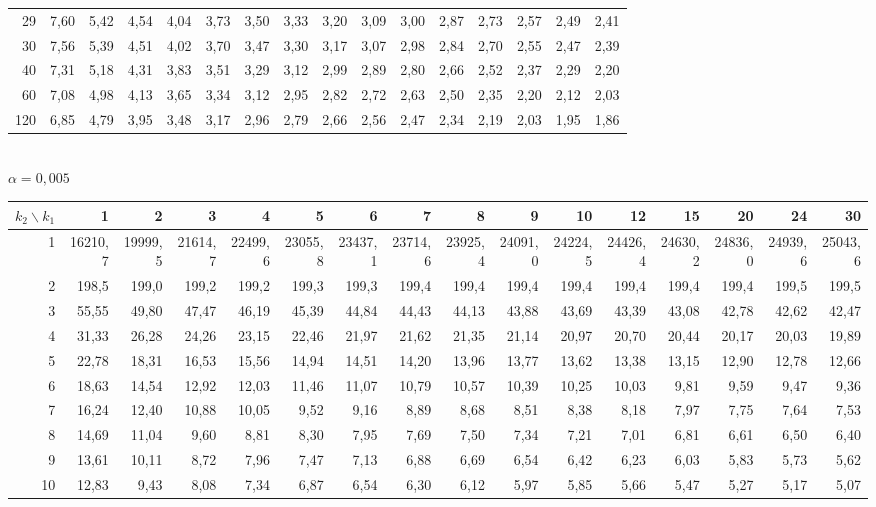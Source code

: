 \documentclass[a4paper,10pt]{extarticle}
\begin{document}
\begin{center}
\begin{tabular}{r|rrrrrrrrrrrrrrr}
29 & 7,60 & 5,42 & 4,54 & 4,04 & 3,73 & 3,50 & 3,33 & 3,20 & 3,09 & 3,00 & 2,87 & 2,73 & 2,57 & 2,49 & 2,41\\
30 & 7,56 & 5,39 & 4,51 & 4,02 & 3,70 & 3,47 & 3,30 & 3,17 & 3,07 & 2,98 & 2,84 & 2,70 & 2,55 & 2,47 & 2,39\\
40 & 7,31 & 5,18 & 4,31 & 3,83 & 3,51 & 3,29 & 3,12 & 2,99 & 2,89 & 2,80 & 2,66 & 2,52 & 2,37 & 2,29 & 2,20\\
60 & 7,08 & 4,98 & 4,13 & 3,65 & 3,34 & 3,12 & 2,95 & 2,82 & 2,72 & 2,63 & 2,50 & 2,35 & 2,20 & 2,12 & 2,03\\
120 & 6,85 & 4,79 & 3,95 & 3,48 & 3,17 & 2,96 & 2,79 & 2,66 & 2,56 & 2,47 & 2,34 & 2,19 & 2,03 & 1,95 & 1,86\\
\end{tabular}\\[5pt]
\textbf{$\alpha=0{,}005$}\\[1pt]
\begin{tabular}{r|rrrrrrrrrrrrrrr}
$k_2\backslash k_1$ & 1 & 2 & 3 & 4 & 5 & 6 & 7 & 8 & 9 & 10 & 12 & 15 & 20 & 24 & 30\\\hline
1 & 16210,7 & 19999,5 & 21614,7 & 22499,6 & 23055,8 & 23437,1 & 23714,6 & 23925,4 & 24091,0 & 24224,5 & 24426,4 & 24630,2 & 24836,0 & 24939,6 & 25043,6\\
2 & 198,5 & 199,0 & 199,2 & 199,2 & 199,3 & 199,3 & 199,4 & 199,4 & 199,4 & 199,4 & 199,4 & 199,4 & 199,4 & 199,5 & 199,5\\
3 & 55,55 & 49,80 & 47,47 & 46,19 & 45,39 & 44,84 & 44,43 & 44,13 & 43,88 & 43,69 & 43,39 & 43,08 & 42,78 & 42,62 & 42,47\\
4 & 31,33 & 26,28 & 24,26 & 23,15 & 22,46 & 21,97 & 21,62 & 21,35 & 21,14 & 20,97 & 20,70 & 20,44 & 20,17 & 20,03 & 19,89\\
5 & 22,78 & 18,31 & 16,53 & 15,56 & 14,94 & 14,51 & 14,20 & 13,96 & 13,77 & 13,62 & 13,38 & 13,15 & 12,90 & 12,78 & 12,66\\
6 & 18,63 & 14,54 & 12,92 & 12,03 & 11,46 & 11,07 & 10,79 & 10,57 & 10,39 & 10,25 & 10,03 & 9,81 & 9,59 & 9,47 & 9,36\\
7 & 16,24 & 12,40 & 10,88 & 10,05 & 9,52 & 9,16 & 8,89 & 8,68 & 8,51 & 8,38 & 8,18 & 7,97 & 7,75 & 7,64 & 7,53\\
8 & 14,69 & 11,04 & 9,60 & 8,81 & 8,30 & 7,95 & 7,69 & 7,50 & 7,34 & 7,21 & 7,01 & 6,81 & 6,61 & 6,50 & 6,40\\
9 & 13,61 & 10,11 & 8,72 & 7,96 & 7,47 & 7,13 & 6,88 & 6,69 & 6,54 & 6,42 & 6,23 & 6,03 & 5,83 & 5,73 & 5,62\\
10 & 12,83 & 9,43 & 8,08 & 7,34 & 6,87 & 6,54 & 6,30 & 6,12 & 5,97 & 5,85 & 5,66 & 5,47 & 5,27 & 5,17 & 5,07\\

\end{tabular}
\end{center}
\end{document}
